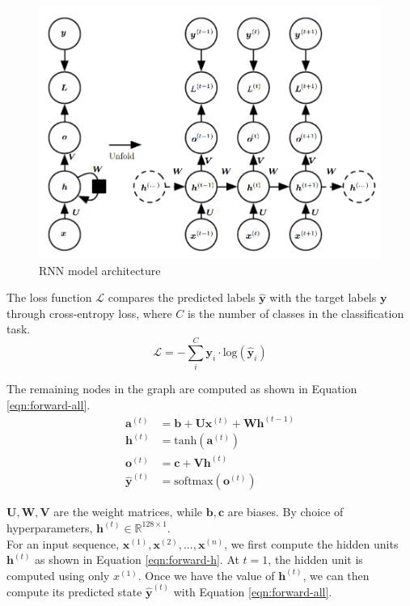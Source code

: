 \documentclass{article}
\numberwithin{equation}{section}
\begin{document}
\begin{figure}[h!]
	\centering
	\includegraphics[width=0.7\linewidth]{assets/rnn.png}
	\caption{RNN model architecture \cite{Goodfellow-et-al-2016}}
	\label{fig:rnn}
\end{figure}

The loss function $\mathcal{L}$ compares the predicted labels $\hat{\bm{y}}$ with the target labels $\bm{y}$ through cross-entropy loss, where $C$ is the number of classes in the classification task.
	$$ \mathcal{L} = -\sum_i^C \bm{y}_i \cdot \text{log}(\hat{\bm{y}}_i) $$

The remaining nodes in the graph are computed as shown in Equation \ref{eqn:forward-all}.
\begin{equation}
\label{eqn:forward-all}
\begin{split}
	\bm{a}^{(t)} &= \bm{b} + \bm{U}\bm{x}^{(t)} + \bm{W}\bm{h}^{(t-1)} \\
	\bm{h}^{(t)} &= \text{tanh}(\bm{a}^{(t)}) \\
	\bm{o}^{(t)} &= \bm{c} + \bm{V}\bm{h}^{(t)} \\
	\hat{\bm{y}}^{(t)} &= \text{softmax}(\bm{o}^{(t)})
\end{split}
\end{equation}

$\bm{U}, \bm{W}, \bm{V}$ are the weight matrices, while $\bm{b}, \bm{c}$ are biases. By choice of hyperparameters, $\bm{h}^{(t)} \in \mathbb{R}^{128\times1}$. \\

For an input sequence, $\bm{x}^{(1)}, \bm{x}^{(2)}, ..., \bm{x}^{(n)}$, we first compute the hidden units $\bm{h}^{(t)}$ as shown in Equation \ref{eqn:forward-h}. At $t=1$, the hidden unit is computed using only $x^{(1)}$. Once we have the value of $\bm{h}^{(t)}$, we can then compute its predicted state $\hat{\bm{y}}^{(t)}$ with Equation \ref{eqn:forward-all}.
\end{document}
